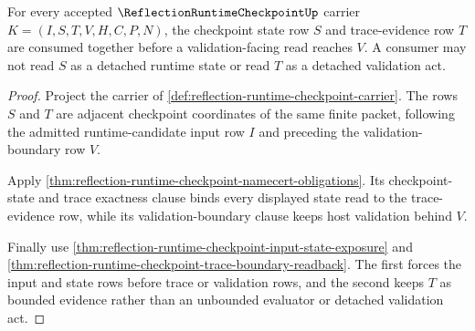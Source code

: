 \begin{theorem}
\label{thm:reflection-runtime-checkpoint-state-trace-coupling}
For every accepted $\ReflectionRuntimeCheckpointUp$ carrier $K=(I,S,T,V,H,C,P,N)$, the checkpoint state row $S$ and trace-evidence row $T$ are consumed together before a validation-facing read reaches $V$. A consumer may not read $S$ as a detached runtime state or read $T$ as a detached validation act.
\end{theorem}
\begin{proof}
Project the carrier of \autoref{def:reflection-runtime-checkpoint-carrier}. The rows $S$ and $T$ are adjacent checkpoint coordinates of the same finite packet, following the admitted runtime-candidate input row $I$ and preceding the validation-boundary row $V$.

Apply \autoref{thm:reflection-runtime-checkpoint-namecert-obligations}. Its checkpoint-state and trace exactness clause binds every displayed state read to the trace-evidence row, while its validation-boundary clause keeps host validation behind $V$.

Finally use \autoref{thm:reflection-runtime-checkpoint-input-state-exposure} and \autoref{thm:reflection-runtime-checkpoint-trace-boundary-readback}. The first forces the input and state rows before trace or validation rows, and the second keeps $T$ as bounded evidence rather than an unbounded evaluator or detached validation act.
\end{proof}

